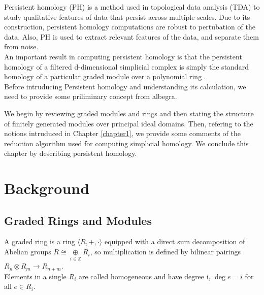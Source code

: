 \documentclass[11pt,a4paper]{report}
\begin{document}
                Persistent homology (PH) is a method used in topological data analysis (TDA) to study
                qualitative features of data that persist across multiple scales. Due to its construction, persistent homology computations are
                robust to pertubation of the data. Also, PH is used to extract relevant features of the data, and separate them from noise. \\
                
                An important result in computing persistent homology is that the persistent homology of a filtered d-dimensional simplicial
                complex is simply the standard homology of a particular graded module over a polynomial ring \cite{Zomorodian_Carlsson_2005}.\\ 
                Before intruducing Persistent homology and understanding its calculation, we need to provide some priliminary concept from albegra. 
                
                We begin by reviewing graded modules and rings and then stating the structure of finitely generated modules over principal
                ideal domains. Then, refering to the notions intruduced in Chapter \ref{chapter1}, we provide some
                comments of the reduction algorithm used for computing simplicial homology. We conclude this chapter by describing persistent
                homology.
                
                
                \section{Background} 
              \subsection{Graded Rings and Modules} 
               
              A graded ring is a ring $\langle R, +, \cdot \rangle$ equipped with a direct sum decomposition of Abelian
              groups $R \cong \underset{i \in \mathbb{Z}}{\oplus} R_i$, so multiplication is defined by bilinear pairings $R_n \otimes R_m \rightarrow R_{n+m}$. \\
              
              Elements in a single $R_i$ are called homogeneous and have degree i, $\deg e = i$ for all $e \in R_i$.
              
\end{document}
